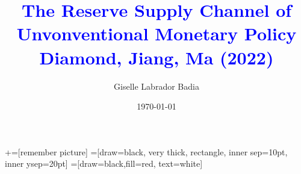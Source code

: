 \documentclass[notes,11pt, aspectratio=169]{beamer}
\title[]{\textcolor{blue}{The Reserve Supply Channel of Unvonventional Monetary Policy \\ Diamond, Jiang, Ma (2022)}}
\author{ Giselle Labrador Badia}
\date{\today}
\begin{document}
\newcommand\marktopleft[1]{%
    \tikz[overlay,remember picture] 
        \node (marker-#1-a) at (-.3em,.3em) {};%
}
\newcommand\markbottomright[2]{%
    \tikz[overlay,remember picture] 
        \node (marker-#1-b) at (0em,0em) {};%
}
+=[remember picture] 
 =[draw=black, very thick, rectangle, inner sep=10pt, inner ysep=20pt]
 =[draw=black,fill=red, text=white]

\begin{frame}
  \maketitle
\end{frame}




    




  
\end{document}
